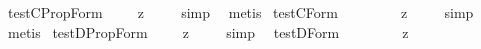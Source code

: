 \begin{isabellebody}
\isanewline
\isanewline
{}\isamarkupfalse%
\ test{\isacharunderscore}C{\isacharunderscore}PropForm{\isacharcolon}\ {\isachardoublequoteopen}{\isacharbrackleft}{\isasymforall}{\isacharparenleft}{\isasymlambda}{\isasymphi}{\isachardot}\ {\isacharparenleft}{\isasymdiamond}\ {\isacharparenleft}{\isasymbox}\ {\isacharcomma}{\isasymphi}{\isacharcomma}{\isacharparenright}{\isacharparenright}\ {\isasymrightarrow}\isactrlsup z\ {\isacharparenleft}{\isasymdiamond}\ {\isacharcomma}{\isasymphi}{\isacharcomma}{\isacharparenright}{\isacharparenright}{\isacharbrackright}{\isachardoublequoteclose}%
\isadelimproof
\ %
\endisadelimproof
%
\isatagproof
{}\isamarkupfalse%
\ {\isacharparenleft}simp{\isacharparenright}\ \isamarkupfalse%
\ metis%
\endisatagproof
{\isafoldproof}%
%
\isadelimproof
%
\endisadelimproof
\isanewline
{}\isamarkupfalse%
\ test{\isacharunderscore}C{\isacharunderscore}Form{\isacharcolon}\ \ \ \ \ {\isachardoublequoteopen}{\isacharbrackleft}{\isasymforall}{\isacharparenleft}{\isasymlambda}{\isasymphi}{\isachardot}\ {\isacharparenleft}{\isasymdiamond}\ {\isacharparenleft}{\isasymbox}\ {\isacharsemicolon}{\isasymphi}{\isacharsemicolon}{\isacharparenright}{\isacharparenright}\ {\isasymrightarrow}\isactrlsup z\ {\isacharparenleft}{\isasymdiamond}\ {\isacharsemicolon}{\isasymphi}{\isacharsemicolon}{\isacharparenright}{\isacharparenright}{\isacharbrackright}{\isachardoublequoteclose}%
\isadelimproof
\ %
\endisadelimproof
%
\isatagproof
{}\isamarkupfalse%
\ {\isacharparenleft}simp{\isacharparenright}\ \isamarkupfalse%
\ metis%
\endisatagproof
{\isafoldproof}%
%
\isadelimproof
%
\endisadelimproof
\isanewline
\isanewline
{}\isamarkupfalse%
\ test{\isacharunderscore}D{\isacharunderscore}PropForm{\isacharcolon}\ {\isachardoublequoteopen}{\isacharbrackleft}{\isasymforall}{\isacharparenleft}{\isasymlambda}{\isasymphi}{\isachardot}\ {\isacharparenleft}{\isasymdiamond}\ {\isacharparenleft}{\isasymbox}\ {\isacharcomma}{\isasymphi}{\isacharcomma}{\isacharparenright}{\isacharparenright}\ {\isasymrightarrow}\isactrlsup z\ {\isacharparenleft}{\isasymbox}\ {\isacharcomma}{\isasymphi}{\isacharcomma}{\isacharparenright}{\isacharparenright}{\isacharbrackright}{\isachardoublequoteclose}%
\isadelimproof
\ %
\endisadelimproof
%
\isatagproof
{}\isamarkupfalse%
\ {\isacharparenleft}simp{\isacharparenright}\ \isamarkupfalse%
%
\endisatagproof
{\isafoldproof}%
%
\isadelimproof
%
\endisadelimproof
\isanewline
{}\isamarkupfalse%
\ test{\isacharunderscore}D{\isacharunderscore}Form{\isacharcolon}\ \ \ \ \ {\isachardoublequoteopen}{\isacharbrackleft}{\isasymforall}{\isacharparenleft}{\isasymlambda}{\isasymphi}{\isachardot}\ {\isacharparenleft}{\isasymdiamond}\ {\isacharparenleft}{\isasymbox}\ {\isacharsemicolon}{\isasymphi}{\isacharsemicolon}{\isacharparenright}{\isacharparenright}\ {\isasymrightarrow}\isactrlsup z\ {\isacharparenleft}{\isasymbox}\ {\isacharsemicolon}{\isasymphi}{\isacharsemicolon}{\isacharparenright}{\isacharparenright}{\isacharbrackright}{\isachardoublequoteclose}%

\end{isabellebody}
